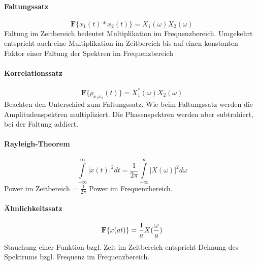\paragraph{Faltungssatz} 
\begin{equation}
\textbf{F} \{x_1(t) \ast x_2(t)\}= X_1(\omega) X_2(\omega)
\end{equation}
Faltung im Zeitbereich bedeutet Multiplikation im Frequenzbereich. Umgekehrt entspricht auch eine Multiplikation im Zeitbereich bis auf einen konstanten Faktor einer Faltung der Spektren im Frequenzbereich

\paragraph{Korrelationssatz}
\begin{equation}
\textbf{F} \{\rho_{x_1x_2}(t)\}= X_1^\ast(\omega) X_2(\omega)
\end{equation}
Beachten den Unterschied zum Faltungssatz. Wie beim Faltungssatz werden die Amplitudenspektren multipliziert. Die Phasenspektren werden aber subtrahiert, bei der Faltung addiert.

\paragraph{Rayleigh-Theorem}
\begin{equation}
\int\limits_{-\infty}^{\infty} | x(t) |^2 dt = \frac{1}{2\pi} \int\limits_{-\infty}^{\infty} | X(\omega)|^2 d\omega
\end{equation}
Power im Zeitbereich = $\frac{1}{2\pi}$ Power im Frequenzbereich.

\paragraph{Ähnlichkeitssatz}
\begin{equation}
{\bf F} \{x(at)\}= \frac{1}{a} X(\frac{\omega}{a})
\end{equation}
Stauchung einer Funktion bzgl. Zeit im Zeitbereich entspricht Dehnung des Spektrums bzgl. Frequenz im Frequenzbereich.



